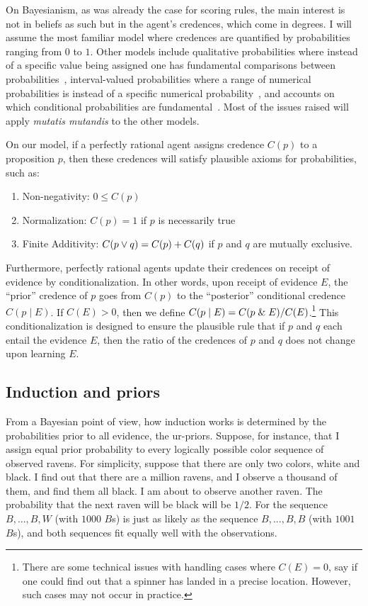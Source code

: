 On Bayesianism, as was already the case for  scoring rules, the main interest is not in beliefs as such but in the agent's credences, which come in degrees. 
I will assume the most familiar model where credences are quantified by probabilities ranging from $0$ to $1$. Other models include qualitative probabilities where instead of a specific value being assigned one has fundamental
comparisons between probabilities~\parencite{KLST}, interval-valued probabilities where a range of numerical probabilities is instead of a specific numerical
probability~\parencite{Kyburg1961,Whitcomb2005}, and accounts on which conditional probabilities
are fundamental~\parencite{HajekCond}. Most of the issues raised will apply 
\textit{mutatis mutandis} to the other models.

On our model, if a perfectly rational agent assigns credence $C(p)$ to a proposition $p$, then these credences will 
satisfy plausible axioms for probabilities, such as:
\begin{enumerate}
\item[(i)] Non-negativity: $0 \le C(p)$
\item[(ii)] Normalization: $C(p)=1$ if $p$ is necessarily true
\item[(iii)] Finite Additivity: $C(p\vee q)=C(p)+C(q)$ if $p$ and $q$ are mutually exclusive.
\end{enumerate}

Furthermore, perfectly rational agents update their credences on receipt of evidence by conditionalization.
In other words, upon receipt of evidence $E$, the ``prior'' credence of $p$ goes from $C(p)$ to the 
``posterior'' conditional credence $C(p\mid E)$. If $C(E)>0$, then we define $C(p\mid E)=C(p\mathrel{\&} E)/C(E)$.\footnote{There 
are some technical issues with handling cases where $C(E)=0$, say if one could find out that a spinner
has landed in a precise location. However, such cases may not occur in practice.} This conditionalization is 
designed to ensure the plausible rule that if $p$ and $q$ each entail the evidence $E$, then the ratio of the 
credences of $p$ and $q$ does not change upon learning $E$. 

\subsection{Induction and priors}
From a Bayesian point of view, how induction works is determined by the probabilities prior to all evidence, the ur-priors.
Suppose, for instance, that I assign equal prior probability to every logically possible color sequence of observed ravens. 
For simplicity, suppose that there are only two colors, white and black.  I find out that there are a million ravens, and 
I observe a thousand of them, and find them all black. I am about to observe another raven. The probability that the next 
raven will be black will be $1/2$. For the sequence $B,...,B,W$ (with $1000$ $B$s) is just as likely as the sequence
$B,...,B,B$ (with $1001$ $B$s), and both sequences fit equally well with the observations. 

